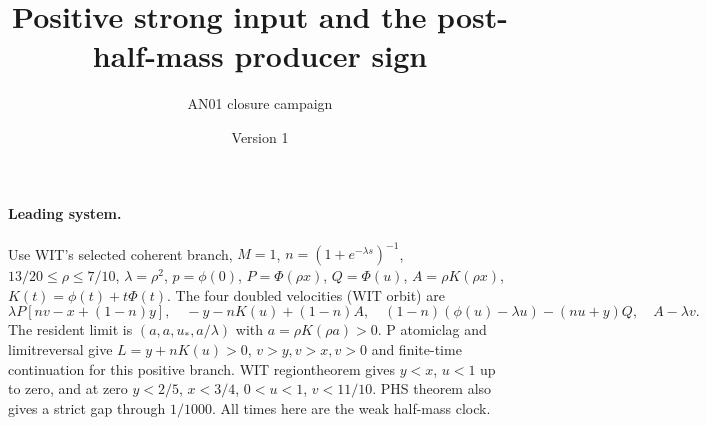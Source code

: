 \documentclass[11pt]{article}
\title{Positive strong input and the post-half-mass producer sign}
\author{AN01 closure campaign}\date{Version 1}
\begin{document}
\maketitle
\paragraph{Leading system.} Use WIT's selected coherent branch,
$M=1$, $n=(1+e^{-\lambda s})^{-1}$, $13/20\le\rho\le7/10$,
$\lambda=\rho^2$, $p=\phi(0)$, $P=\Phi(\rho x)$,
$Q=\Phi(u)$, $A=\rho K(\rho x)$, $K(t)=\phi(t)+t\Phi(t)$.
The four doubled velocities (WIT orbit) are
\[
 \lambda P[nv-x+(1-n)y],\quad -y-nK(u)+(1-n)A,\quad
 (1-n)(\phi(u)-\lambda u)-(nu+y)Q,\quad A-\lambda v .
\]
The resident limit is $(a,a,u_*,a/\lambda)$ with $a=\rho K(\rho a)>0$.
P atomiclag and limitreversal give $L=y+nK(u)>0$, $v>y,v>x,v>0$
and finite-time continuation for this positive branch. WIT regiontheorem
gives $y<x$, $u<1$ up to zero, and at zero $y<2/5$, $x<3/4$,
$0<u<1$, $v<11/10$. PHS theorem also gives a strict gap through
$1/1000$. All times here are the weak half-mass clock.
\end{document}
